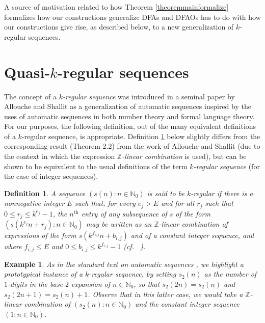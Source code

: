 \documentclass[12pt]{article}
\newtheorem{definition}{Definition}
\newtheorem{example}{Example}
\begin{document}
 A source of motivation related to how Theorem \ref{theoremmainformalize} formalizes how our constructions generalize DFAs and 
 DFAOs has to do with how our constructions give rise, as described below, to a new generalization of $k$-regular sequences. 

\section{Quasi-$k$-regular sequences}
 The concept of a \emph{$k$-regular sequence} was introduced in a seminal paper by Allouche and Shallit \cite{AlloucheShallit1992} 
 as a generalization of automatic sequences inspired by the uses of automatic sequences in both number theory and formal language 
 theory. For our purposes, the following definition, out of the many equivalent definitions of a $k$-regular sequence, is appropriate. 
 Definition \ref{definitionkreg} below slightly differs from the corresponding result (Theorem 2.2) from the work of Allouche and Shallit 
 \cite{AlloucheShallit1992} (due to the context in which the expression \emph{$\mathbb{Z}$-linear combination} is used), but can be 
 shown to be equivalent to the usual definitions of the term \emph{$k$-regular sequence} (for the case of integer sequences). 

\begin{definition}\label{definitionkreg}
 A sequence $(s(n) : n \in \mathbb{N}_{0} )$ is said to be \emph{$k$-regular} if there is a nonnegative integer $E$ such that, for every 
 $e_j > E$ and for all $r_j$ such that $0 \leq r_j \leq k^{e_j} - 1$, the $n^{\text{th}}$ entry of any subsequence of $s$ of the form $ 
 (s(k^{e_j} n + r_j ) : n \in \mathbb{N}_{0} )$ may be written as an $\mathbb{Z}$-linear combination of expressions of the form $ s\left( 
 k^{f_{i, j}} n + b_{i, j} \right) $ and of a constant integer sequence, and where $f_{i, j} \leq E$ and $0 \leq b_{i, j} \leq k^{f_{i, j}} - 1$ 
 (cf.\ \cite[Theorem 16.1.3]{AlloucheShallit2003} \cite{AlloucheShallit1992}). 
\end{definition}

\begin{example}
 As in the standard text on automatic sequences \cite[p.\ 438]{AlloucheShallit2003}, we highlight a prototypical instance of a 
 $k$-regular sequence, by setting $s_{2}(n)$ as the number of $1$-digits in the base-$2$ expansion of $n \in \mathbb{N}_{0}$, so that 
 $s_{2}(2n) = s_{2}(n)$ and $s_{2}(2n + 1) = s_{2}(n) + 1$. Observe that in this latter case, we would take a $\mathbb{Z}$-linear 
 combination of $(s_2(n) : n \in \mathbb{N}_{0})$ and the constant integer sequence $(1 : n \in \mathbb{N}_{0})$. 
\end{example}
\end{document}
